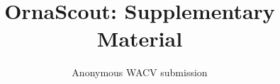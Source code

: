\documentclass[10pt,twocolumn,letterpaper]{article}
\title{OrnaScout: Supplementary Material}
\author{Anonymous WACV submission}
\begin{document}
\maketitle











{\small


}
\end{document}

